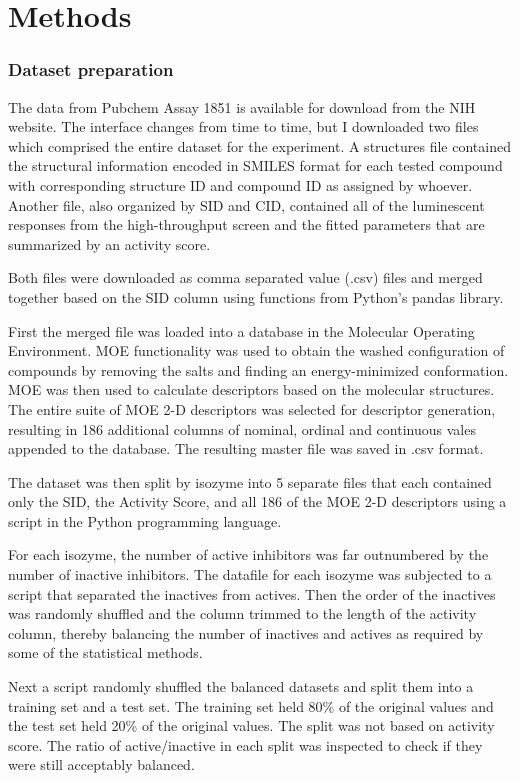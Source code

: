\section{Methods}
\subsubsection{Dataset preparation}
The data from Pubchem Assay 1851 is available for download from the NIH website. The interface changes from time to time, but I downloaded two files which comprised the entire dataset for the experiment. A structures file contained the structural information encoded in SMILES format for each tested compound with corresponding structure ID and compound ID as assigned by whoever. Another file, also organized by SID and CID, contained all of the luminescent responses from the high-throughput screen and the fitted parameters that are summarized by an activity score. 

Both files were downloaded as comma separated value (.csv) files and merged together based on the SID column using functions from Python's pandas library.

First the merged file was loaded into a database in the Molecular Operating Environment. MOE functionality was used to obtain the washed configuration of compounds by removing the salts and finding an energy-minimized conformation. MOE was then used to calculate descriptors based on the molecular structures. The entire suite of MOE 2-D descriptors was selected for descriptor generation, resulting in 186 additional columns of nominal, ordinal and continuous vales appended to the database. The resulting master file was saved in .csv format.

The dataset was then split by isozyme into 5 separate files that each contained only the SID, the Activity Score, and all 186 of the MOE 2-D descriptors using a script in the Python programming language.

For each isozyme, the number of active inhibitors was far outnumbered by the number of inactive inhibitors. The datafile for each isozyme was subjected to a script that separated the inactives from actives. Then the order of the inactives was randomly shuffled and the column trimmed to the length of the activity column, thereby balancing the number of inactives and actives as required by some of the statistical methods. 

Next a script randomly shuffled the balanced datasets and split them into a training set and a test set. The training set held 80\% of the original values and the test set held 20\% of the original values. The split was not based on activity score. The ratio of active/inactive in each split was inspected to check if they were still acceptably balanced.

